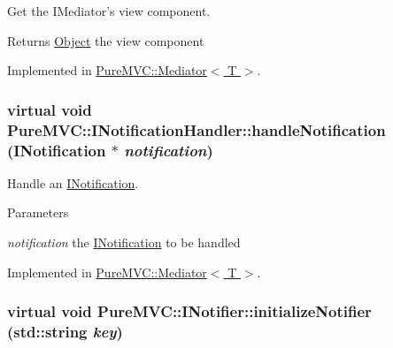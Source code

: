Get the {\ttfamily IMediator}'s view component. \begin{DoxyReturn}{Returns}
\hyperlink{class_pure_m_v_c_1_1_object}{Object} the view component 
\end{DoxyReturn}


Implemented in \hyperlink{class_pure_m_v_c_1_1_mediator_aadd3a8ea554fb01f8fcac30592ef0275}{PureMVC::Mediator$<$ T $>$}.\hypertarget{class_pure_m_v_c_1_1_i_notification_handler_af31efbe0929caff0ac371bf45d3e9c50}{
\subsubsection[{handleNotification}]{\setlength{\rightskip}{0pt plus 5cm}virtual void PureMVC::INotificationHandler::handleNotification ({\bf INotification} $\ast$ {\em notification})}}
\label{class_pure_m_v_c_1_1_i_notification_handler_af31efbe0929caff0ac371bf45d3e9c50}


Handle an {\ttfamily \hyperlink{class_pure_m_v_c_1_1_i_notification}{INotification}}. 
\begin{DoxyParams}{Parameters}
\item[{\em notification}]the {\ttfamily \hyperlink{class_pure_m_v_c_1_1_i_notification}{INotification}} to be handled \end{DoxyParams}


Implemented in \hyperlink{class_pure_m_v_c_1_1_mediator_a869785c4f70518e40eaae7395c5f1d48}{PureMVC::Mediator$<$ T $>$}.\hypertarget{class_pure_m_v_c_1_1_i_notifier_a28d7dbbe0726d4d52080546c5d79b232}{
\subsubsection[{initializeNotifier}]{\setlength{\rightskip}{0pt plus 5cm}virtual void PureMVC::INotifier::initializeNotifier (std::string {\em key})}}
\label{class_pure_m_v_c_1_1_i_notifier_a28d7dbbe0726d4d52080546c5d79b232}


